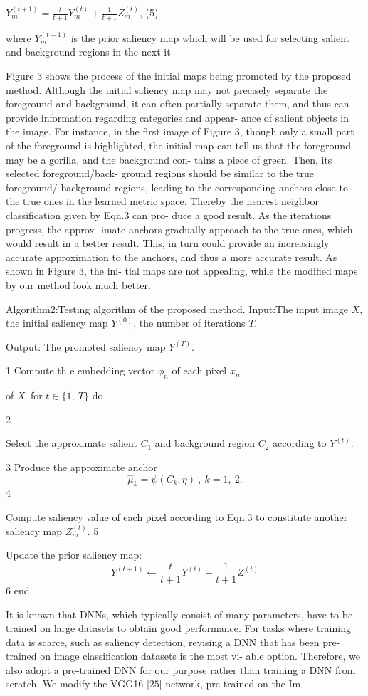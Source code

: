 \documentclass[a4paper,10pt]{article}
\begin{document}
$Y_{m}^{(t+1)}=\displaystyle \frac{t}{t+1}Y_{m}^{(t)}+\frac{1}{t+1}Z_{m}^{(t)}$, (5)

where $Y_{m}^{(t+1)}$ is the prior saliency map which will be used for selecting salient and background regions in the next it-

Figure 3 shows the process of the initial maps being promoted by the proposed method. Although the initial saliency map may not precisely separate the foreground and background, it can often partially separate them, and thus can provide information regarding categories and appear- ance of salient objects in the image. For instance, in the first image of Figure 3, though only a small part of the foreground is highlighted, the initial map can tell us that the foreground may be a gorilla, and the background con- tains a piece of green. Then, its selected foreground/back- ground regions should be similar to the true foreground/ background regions, leading to the corresponding anchors close to the true ones in the learned metric space. Thereby the nearest neighbor classification given by Eqn.3 can pro- duce a good result. As the iterations progress, the approx- imate anchors gradually approach to the true ones, which would result in a better result. This, in turn could provide an increasingly accurate approximation to the anchors, and thus a more accurate result. As shown in Figure 3, the ini- tial maps are not appealing, while the modified maps by our method look much better.

Algorithm2:Testing algorithm of the proposed method.  Input:The input image $X$, the initial saliency map $Y^{(0)}$, the number of iterations $T.$

Output: The promoted saliency map $Y^{(T)}.$

1 Compute th $\mathrm{e}$ embedding vector $\phi_{n}$ of each pixel $x_{n}$

of {\it X}. for $t\in\{1,\ T\}$ do

2

Select the approximate salient $C_{1}$ and background region $C_{2}$ according to $Y^{(t)}.$

3 Produce the approximate anchor
$$
\hat{\mu}_{k}=\psi(C_{k};\eta)\ ,\ k=1,\ 2.
$$
4

Compute saliency value of each pixel according to Eqn.3 to constitute another saliency map $Z_{m}^{(t)}.$ 5

Update the prior saliency map:
$$
Y^{(t+1)}\leftarrow\frac{t}{t+1}Y^{(t)}+\frac{1}{t+1}Z^{(t)}
$$
6 end

It is known that DNNs, which typically consist of many parameters, have to be trained on large datasets to obtain good performance. For tasks where training data is scarce, such as saliency detection, revising a DNN that has been pre-trained on image classification datasets is the most vi- able option. Therefore, we also adopt a pre-trained DNN for our purpose rather than training a DNN from scratch. We modify the VGG16 $|25|$ network, pre-trained on the Im-
\end{document}
